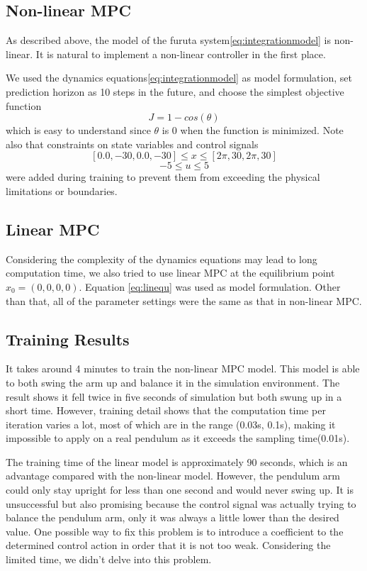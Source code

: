 \documentclass{LTHtwocol} %
\begin{document}
\subsection{Non-linear MPC}
As described above, the model of the furuta system\eqref{eq:integrationmodel} is non-linear. It is natural to implement a non-linear controller in the first place.

We used the dynamics equations\eqref{eq:integrationmodel} as model formulation, set prediction horizon as 10 steps in the future, and choose the simplest objective function $$J = 1 - cos(\theta)$$ which is easy to understand since $\theta$ is 0 when the function is minimized. Note also that constraints on state variables and control signals $$[0.0, -30, 0.0, -30] \leq x \leq [2\pi, 30, 2\pi, 30]$$ $$-5 \leq u \leq 5$$ were added during training to prevent them from exceeding the physical limitations or boundaries.

\subsection{Linear MPC}
Considering the complexity of the dynamics equations may lead to long computation time, we also tried to use linear MPC at the equilibrium point $x_0 = (0,0,0,0)$. Equation \eqref{eq:linequ} was used as model formulation. Other than that, all of the parameter settings were the same as that in non-linear MPC.

\subsection{Training Results}
It takes around 4 minutes to train the non-linear MPC model. This model is able to both swing the arm up and balance it in the simulation environment. The result shows it fell twice in  five seconds of simulation but both swung up in a short time. However, training detail shows that the computation time per iteration varies a lot, most of which are in the range (0.03s, 0.1s), making it impossible to apply on a real pendulum as it exceeds the sampling time(0.01s).

The training time of the linear model is approximately 90 seconds, which is an advantage compared with the non-linear model. However, the pendulum arm could only stay upright for less than one second and would never swing up. It is unsuccessful but also promising because the control signal was actually trying to balance the pendulum arm, only it was always a little lower than the desired value. One possible way to fix this problem is to introduce a coefficient to the determined control action in order that it is not too weak. Considering the limited time, we didn't delve into this problem.
\end{document}
